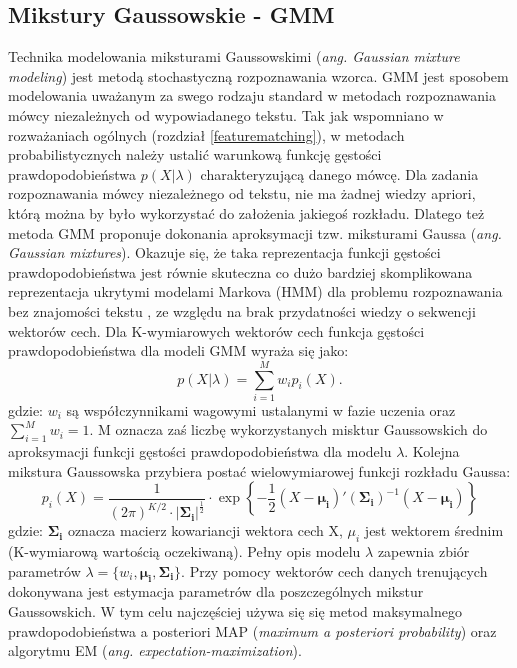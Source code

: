 \subsection{Mikstury Gaussowskie - GMM}
Technika modelowania miksturami Gaussowskimi (\textit{ang. Gaussian mixture modeling}) jest metodą stochastyczną rozpoznawania wzorca. GMM jest sposobem modelowania uważanym za swego rodzaju standard w metodach rozpoznawania mówcy niezależnych od wypowiadanego tekstu. Tak jak wspomniano w rozważaniach ogólnych (rozdział \ref{featurematching}), w metodach probabilistycznych należy ustalić warunkową funkcję gęstości prawdopodobieństwa $p(X|\lambda)$ charakteryzującą danego mówcę. Dla
zadania rozpoznawania mówcy niezależnego od tekstu, nie ma żadnej wiedzy apriori, którą można by było wykorzystać do założenia jakiegoś rozkładu. Dlatego też metoda GMM proponuje dokonania aproksymacji tzw. miksturami Gaussa (\textit{ang. Gaussian mixtures}). Okazuje się, że taka reprezentacja funkcji gęstości prawdopodobieństwa jest równie skuteczna co dużo bardziej skomplikowana reprezentacja ukrytymi modelami Markova (HMM) dla problemu rozpoznawania bez znajomości tekstu \cite{reynolds}, ze względu na brak przydatności wiedzy o sekwencji wektorów cech. Dla K-wymiarowych wektorów cech funkcja gęstości prawdopodobieństwa dla modeli GMM wyraża się jako:
\begin{equation}
  p(X|\lambda) = \sum^{M}_{i=1} w_ip_i(X).
\end{equation}
gdzie: $w_i$ są współczynnikami wagowymi ustalanymi w fazie uczenia oraz $\sum_{i=1}^{M} w_i =1$. M oznacza zaś liczbę wykorzystanych misktur Gaussowskich do aproksymacji funkcji gęstości prawdopodobieństwa dla modelu $ \lambda$. Kolejna mikstura Gaussowska przybiera postać wielowymiarowej funkcji rozkładu Gaussa:
\begin{equation}
  p_i(X)=\frac{1}{(2\pi)^{K/2} \cdot |\bm{\Sigma_i}|^{\frac{1}{2}}} \cdot \exp\left\{-\frac{1}{2}(X- \bm{\mu_i})'(\bm{\Sigma_i})^{-1}(X-\bm{\mu_i})\right\}
\end{equation}
gdzie: $\bm{\Sigma_i}$ oznacza macierz kowariancji wektora cech X, $\mu_i$ jest wektorem średnim (K-wymiarową wartością oczekiwaną). Pełny opis modelu $\lambda$ zapewnia zbiór parametrów $\lambda = \{w_i,\bm{\mu_i},\bm{\Sigma_i} \}$. Przy pomocy wektorów cech danych trenujących dokonywana jest estymacja parametrów dla poszczególnych mikstur Gaussowskich. W tym celu najczęściej używa się się metod maksymalnego prawdopodobieństwa a posteriori MAP (\textit{maximum a posteriori probability}) oraz algorytmu EM (\textit{ang. expectation-maximization}).

